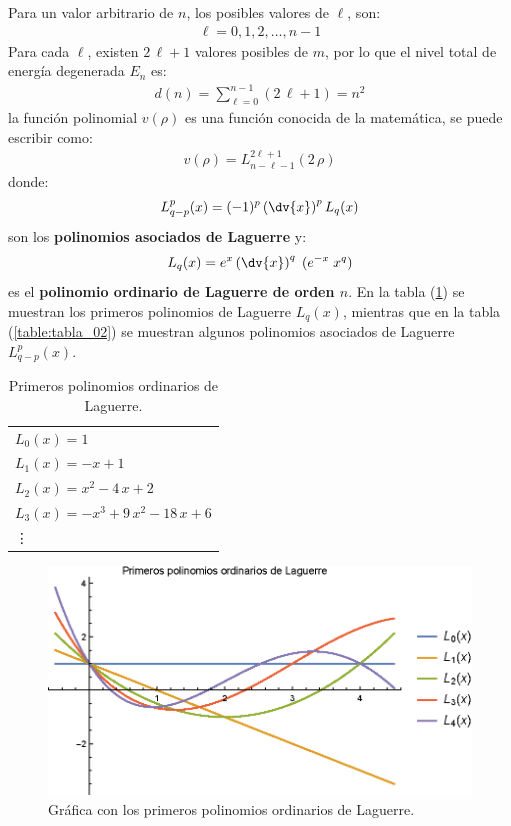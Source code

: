 Para un valor arbitrario de $n$, los posibles valores de $\ell$, son:
\begin{align}
\ell = 0, 1, 2, \ldots, n - 1
\label{eq:ecuacion_04_84}
\end{align}
Para cada $\ell$, existen $2 \, \ell + 1$ valores posibles de $m$, por lo que el nivel total de energía degenerada $E_{n}$ es:
\begin{align}
d(n) = \sum_{\ell = 0}^{n - 1} (2 \, \ell + 1) = n^{2}
\label{eq:ecuacion_04_85}
\end{align}
la función polinomial $v(\rho)$ es una función conocida de la matemática, se puede escribir como:
\begin{align}
v(\rho) = L_{n-\ell-1}^{2\ell+1}(2 \, \rho)
\label{eq:ecuacion_04_86}
\end{align}
donde:
\begin{align}
L_{q-p}^{p} (x) = (-1)^{p} \left( \dv{x} \right)^{p} L_{q}(x)
\label{eq:ecuacion_04_87}
\end{align}
son los \textbf{polinomios asociados de Laguerre} y:
\begin{align}
L_{q}(x) = e^{x} \left( \dv{x} \right)^{q} \; (e^{-x} \; x^{q})
\label{eq:ecuacion_04_88}
\end{align}
es el \textbf{polinomio ordinario de Laguerre de orden $n$}.
En la tabla (\ref{table:tabla_01}) se muestran los primeros polinomios de Laguerre $L_{q}(x)$, mientras que en la tabla (\ref{table:tabla_02}) se muestran algunos polinomios asociados de Laguerre $L_{q-p}^{p}(x)$.
\begin{table}[H]
\centering
\large
\begin{tabular}{l}
$L_{0} (x) = 1$ \\
$L_{1} (x) = - x + 1$ \\
$L_{2} (x) = x^{2} - 4 \, x + 2$ \\
$L_{3} (x) = - x^{3} + 9 \, x^{2} - 18 \, x + 6$ \\
\vdots 
\end{tabular}
\caption{Primeros polinomios ordinarios de Laguerre.}
\label{table:tabla_01}
\end{table}
\begin{figure}[H]
    \centering
    \includegraphics[scale=1.2]{Imagenes/Polinomios_Laguerre_01.eps}
    \caption{Gráfica con los primeros polinomios ordinarios de Laguerre.}
    \label{fig:grafica_Laguerre_01}
\end{figure}
